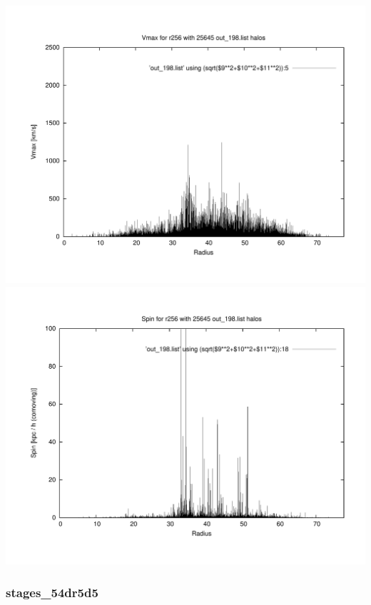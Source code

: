 \includegraphics[scale=0.3]{r256/h100/stages_52/plot_Vmax_out_198.pdf}
\includegraphics[scale=0.3]{r256/h100/stages_52/plot_spin_out_198.pdf}


% 
%
%
%
%
%
%
%


\newpage
\subsubsection{stages\_54dr5d5}

% 
% 
% 
% 
% 
%
%
%
%
%
%
%


